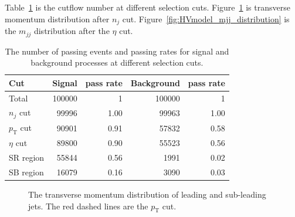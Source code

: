 \documentclass[12pt]{article}
\begin{document}
        Table~\ref{tab:HVmodel_cutflow_number} is the cutflow number at different selection cuts. Figure~\ref{fig:HVmodel_pt_distribution} is transverse momentum distribution after $n_j$ cut. Figure~\ref{fig:HVmodel_mjj_distribution} is the $m_{jj}$ distribution after the $\eta$ cut.
        \begin{table}[htpb]
            \centering
            \caption{The number of passing events and passing rates for signal and background processes at different selection cuts.}
            \label{tab:HVmodel_cutflow_number}
            \begin{tabular}{l|rr|rr}
            Cut                & Signal & pass rate & Background & pass rate \\ \hline
            Total              & 100000  & 1         & 100000     & 1         \\
            $n_j$ cut          & 99996   & 1.00      & 99963      & 1.00      \\
            $p_{\text{T}}$ cut & 90901   & 0.91      & 57832      & 0.58      \\
            $\eta$ cut         & 89800   & 0.90      & 55523      & 0.56      \\ \hline
            SR region          & 55844   & 0.56      & 1991       & 0.02      \\
            SB region          & 16079   & 0.16      & 3090       & 0.03
            \end{tabular}
        \end{table}

        \begin{figure}[htpb]
            \centering
            \caption{The transverse momentum distribution of leading and sub-leading jets. The red dashed lines are the $p_{\text{T}}$ cut.}
            \label{fig:HVmodel_pt_distribution}
        \end{figure}
\end{document}
